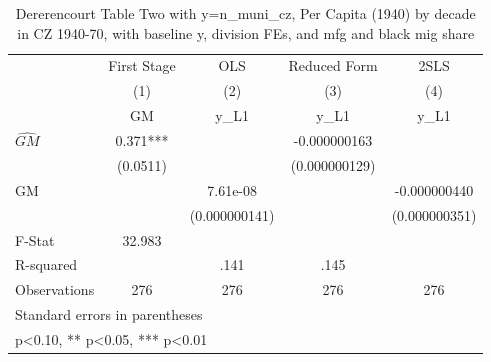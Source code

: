 \begin{table}[htbp]\centering
\def\sym#1{\ifmmode^{#1}\else\(^{#1}\)\fi}
\caption{Dererencourt Table Two with y=n\_muni\_cz, Per Capita (1940) by decade in CZ 1940-70, with baseline y, division FEs, and mfg and black mig share}
\begin{tabular}{l*{4}{c}}
\toprule
                    & First Stage   &         OLS   &Reduced Form   &        2SLS   \\
                    &\multicolumn{1}{c}{(1)}&\multicolumn{1}{c}{(2)}&\multicolumn{1}{c}{(3)}&\multicolumn{1}{c}{(4)}\\
                    &\multicolumn{1}{c}{GM}&\multicolumn{1}{c}{y\_L1}&\multicolumn{1}{c}{y\_L1}&\multicolumn{1}{c}{y\_L1}\\
\midrule
$\hat{GM}$          &       0.371***&               &-0.000000163   &               \\
                    &    (0.0511)   &               &(0.000000129)   &               \\
\addlinespace
GM                  &               &    7.61e-08   &               &-0.000000440   \\
                    &               &(0.000000141)   &               &(0.000000351)   \\
\midrule
F-Stat              &      32.983   &               &               &               \\
R-squared           &               &        .141   &        .145   &               \\
Observations        &         276   &         276   &         276   &         276   \\
\bottomrule
\multicolumn{5}{l}{\footnotesize Standard errors in parentheses}\\
\multicolumn{5}{l}{\footnotesize * p<0.10, ** p<0.05, *** p<0.01}\\
\end{tabular}
\end{table}
